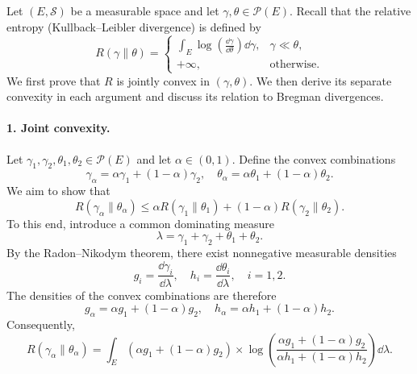 \documentclass[12pt,a4paper,oneside]{book}
\begin{document}
\begin{solution}

Let $(E,\mathcal S)$ be a measurable space and let $\gamma,\theta\in\mathcal P(E)$. Recall that the relative entropy (Kullback--Leibler
divergence) is defined by
\begin{equation*}
    R(\gamma\|\theta) =
        \begin{cases}
            \displaystyle
            \int_E \log\left(\frac{\dd\gamma}{\dd\theta}\right) \dd\gamma, & \gamma\ll\theta,\\[1em]
            +\infty, & \text{otherwise}.
    \end{cases}
\end{equation*}
We first prove that $R$ is jointly convex in $(\gamma,\theta)$. We then derive its separate convexity in each argument and
discuss its relation to Bregman divergences.

\paragraph{1. Joint convexity.}

Let $\gamma_1,\gamma_2,\theta_1,\theta_2\in\mathcal P(E)$ and let $\alpha\in(0,1)$. Define the convex combinations
\begin{equation*}
    \gamma_\alpha = \alpha\gamma_1+(1-\alpha)\gamma_2, \quad
    \theta_\alpha = \alpha\theta_1+(1-\alpha)\theta_2.
\end{equation*}
We aim to show that
\begin{equation}
    R(\gamma_\alpha\|\theta_\alpha) \leq \alpha R(\gamma_1\|\theta_1) + (1-\alpha)R(\gamma_2\|\theta_2).
    \label{eq:joint-convexity}
\end{equation}
To this end, introduce a common dominating measure
\begin{equation*}
    \lambda=\gamma_1+\gamma_2+\theta_1+\theta_2.
\end{equation*}
By the Radon--Nikodym theorem, there exist nonnegative measurable densities
\begin{equation*}
    g_i=\frac{\dd\gamma_i}{\dd\lambda}, \quad
    h_i=\frac{\dd\theta_i}{\dd\lambda}, \quad i=1,2.
\end{equation*}
The densities of the convex combinations are therefore
\begin{equation*}
    g_\alpha=\alpha g_1+(1-\alpha)g_2, \quad
    h_\alpha=\alpha h_1+(1-\alpha)h_2.
\end{equation*}
Consequently,
\begin{equation*}
    R(\gamma_\alpha\|\theta_\alpha) =
    \int_E (\alpha g_1+(1-\alpha)g_2)
    \times
    \log\left(
        \frac{\alpha g_1+(1-\alpha)g_2}{\alpha h_1+(1-\alpha)h_2}
    \right)\dd\lambda.
\end{equation*}


\end{solution}
\end{document}
